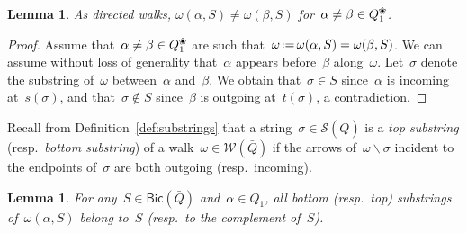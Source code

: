 \documentclass{amsart}
\newtheorem{lemma}[theorem]{Lemma}
\theoremstyle{definition}
\newtheorem{example}[theorem]{Example}
\newcommand{\ssm}{\smallsetminus} %
\newcommand{\eqdef}{\mbox{\,\raisebox{0.2ex}{\scriptsize\ensuremath{\mathrm:}}\ensuremath{=}\,}} %
\newcommand{\fref}[1]{Figure~\ref{#1}} %
\newcommand{\darkblue}{\color{darkblue}} %
\newcommand{\defn}[1]{\textsl{\darkblue #1}} %
\newcommand{\blossom}{^\text{\ding{96}}} %
\newcommand{\strings}{\mathcal{S}} %
\newcommand{\walks}{\mathcal{W}} %
\newcommand{\Bicl}[1]{\mathsf{Bic}(#1)} %
\begin{document}

\begin{lemma}
\label{lem:distinctDirectedWalks}
As directed walks, $\omega(\alpha,S) \ne \omega(\beta,S)$ for~$\alpha \ne \beta \in Q_1\blossom$.
\end{lemma}

\begin{proof}
Assume that~$\alpha \ne \beta \in Q_1\blossom$ are such that~$\omega \eqdef \omega(\alpha,S) = \omega(\beta,S)$.
We can assume without loss of generality that~$\alpha$ appears before~$\beta$ along~$\omega$.
Let~$\sigma$ denote the substring of~$\omega$ between~$\alpha$ and~$\beta$.
We obtain that~$\sigma \in S$ since~$\alpha$ is incoming at~$s(\sigma)$, and that~$\sigma \notin S$ since~$\beta$ is outgoing at~$t(\sigma)$, a contradiction.
\end{proof}

Recall from Definition~\ref{def:substrings} that a string~$\sigma \in \strings(\bar Q)$ is a \defn{top substring} (resp.~\defn{bottom substring}) of a walk~$\omega \in \walks(\bar Q)$ if the arrows of~$\omega \ssm \sigma$ incident to the endpoints of~$\sigma$ are both outgoing (resp.~incoming).

\begin{lemma}
\label{lem:positiveNegativeOrientation}
For any~$S \in \Bicl{\bar Q}$ and~$\alpha \in Q_1$, all bottom (resp.~top) substrings of~$\omega(\alpha,S)$ belong to~$S$ (resp.~to the complement of~$S$).
\end{lemma}
\end{document}
